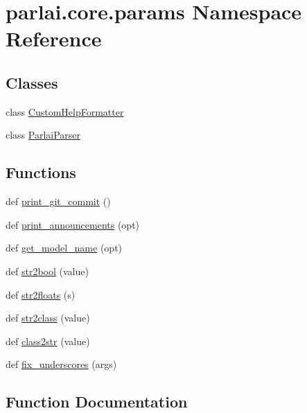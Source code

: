 \hypertarget{namespaceparlai_1_1core_1_1params}{}\section{parlai.\+core.\+params Namespace Reference}
\label{namespaceparlai_1_1core_1_1params}
\subsection*{Classes}
\begin{DoxyCompactItemize}
\item 
class \hyperlink{classparlai_1_1core_1_1params_1_1CustomHelpFormatter}{Custom\+Help\+Formatter}
\item 
class \hyperlink{classparlai_1_1core_1_1params_1_1ParlaiParser}{Parlai\+Parser}
\end{DoxyCompactItemize}
\subsection*{Functions}
\begin{DoxyCompactItemize}
\item 
def \hyperlink{namespaceparlai_1_1core_1_1params_ac8624bf16ab6b2df0f2869f29a92c90b}{print\+\_\+git\+\_\+commit} ()
\item 
def \hyperlink{namespaceparlai_1_1core_1_1params_afd1a47c94990168ea9e70d894a79bd2c}{print\+\_\+announcements} (opt)
\item 
def \hyperlink{namespaceparlai_1_1core_1_1params_a6d160324f6af84562334fd0698141074}{get\+\_\+model\+\_\+name} (opt)
\item 
def \hyperlink{namespaceparlai_1_1core_1_1params_a714c9ed20ecfb4f9d524ccbe3510fecc}{str2bool} (value)
\item 
def \hyperlink{namespaceparlai_1_1core_1_1params_a3ef8c61c55a77674dd852c5b9f21e560}{str2floats} (s)
\item 
def \hyperlink{namespaceparlai_1_1core_1_1params_aa6083a72ad328d26016bd5f805a0b1c8}{str2class} (value)
\item 
def \hyperlink{namespaceparlai_1_1core_1_1params_a4abab85fb7a745de31fcc73de5840a60}{class2str} (value)
\item 
def \hyperlink{namespaceparlai_1_1core_1_1params_afe2837a1dc21017be30cc7e3cb3696b8}{fix\+\_\+underscores} (args)
\end{DoxyCompactItemize}


\subsection{Function Documentation}
\mbox{\label{namespaceparlai_1_1core_1_1params_a4abab85fb7a745de31fcc73de5840a60}} 

